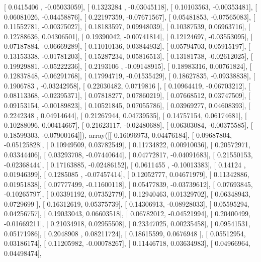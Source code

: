 \documentclass{article}
\begin{document}
       [ 0.0415406 , -0.05033059],
       [ 0.1323284 , -0.03045118],
       [ 0.10103563, -0.00353481],
       [ 0.06081026, -0.04458876],
       [ 0.22197359, -0.07671567],
       [ 0.05481853, -0.07565083],
       [ 0.11552781, -0.00375027],
       [ 0.18183597,  0.09948039],
       [ 0.10387539,  0.06963716],
       [ 0.12788636,  0.04306501],
       [ 0.19390042, -0.00741814],
       [ 0.12124697, -0.03553095],
       [ 0.07187884, -0.06669289],
       [ 0.11010136,  0.03844932],
       [ 0.05794703,  0.05915197],
       [ 0.13153338, -0.01781203],
       [ 0.15287234,  0.05816513],
       [ 0.13181738, -0.02612025],
       [ 0.19929881, -0.05222236],
       [ 0.2193106 , -0.09148915],
       [ 0.18983316,  0.00761824],
       [ 0.12837848, -0.06291768],
       [ 0.17994719, -0.01535429],
       [ 0.18627835, -0.09338838],
       [ 0.1906783 , -0.03242958],
       [ 0.22030482,  0.0719816 ],
       [ 0.10964419, -0.06703212],
       [ 0.08113368, -0.02395371],
       [ 0.07818277,  0.07860219],
       [ 0.07668512,  0.03747509],
       [ 0.09153154, -0.00189823],
       [ 0.10521845,  0.07055786],
       [ 0.03969277,  0.04608393],
       [ 0.2242348 ,  0.04914644],
       [ 0.21267944,  0.04739535],
       [ 0.14757154,  0.06174681],
       [ 0.10288096,  0.00414667],
       [ 0.21623117, -0.02480688],
       [ 0.06303084, -0.00375585],
       [ 0.18599303, -0.07900164]]), array([[ 0.16096973,  0.04476184],
       [ 0.09687804, -0.05125828],
       [ 0.10949509,  0.03782549],
       [ 0.11734822,  0.00910036],
       [ 0.20572971,  0.03344406],
       [ 0.03293708, -0.07440644],
       [ 0.04772817, -0.04091683],
       [ 0.21550153, -0.02368444],
       [ 0.17163885, -0.02486152],
       [ 0.0611455 , -0.10013383],
       [ 0.14124   ,  0.01946399],
       [ 0.1285085 , -0.07457414],
       [ 0.12052777,  0.04671979],
       [ 0.11342886,  0.01951838],
       [ 0.07777499, -0.11600118],
       [ 0.05477839, -0.03739612],
       [ 0.07693845, -0.10265797],
       [ 0.03391192,  0.07352779],
       [ 0.12940463,  0.01329702],
       [ 0.06348943,  0.0729699 ],
       [ 0.16312619,  0.05375739],
       [ 0.14306913, -0.08928033],
       [ 0.05595294,  0.04256757],
       [ 0.19033043,  0.06603518],
       [ 0.06782012, -0.04521994],
       [ 0.20400499, -0.01669211],
       [ 0.21034918,  0.02955508],
       [ 0.23347025,  0.00235458],
       [ 0.09541531,  0.05171986],
       [ 0.2048908 ,  0.08211724],
       [ 0.18615599,  0.0676948 ],
       [ 0.05512954,  0.03186174],
       [ 0.11205982, -0.00078267],
       [ 0.11446718,  0.03634983],
       [ 0.04966964,  0.04498474],
\end{document}

